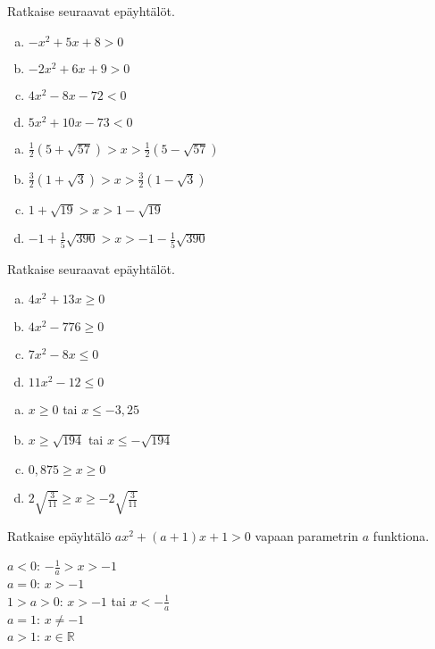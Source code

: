 \begin{tehtava}
    Ratkaise seuraavat epäyhtälöt.
    \begin{enumerate}[(a)]
        \item $-x^2+5x+8>0$
        \item $-2x^2+6x+9>0$
        \item $4x^2-8x-72<0$
        \item $5x^2+10x-73<0$
    \end{enumerate}
    \begin{vastaus}
        \begin{enumerate}[(a)]
            \item $\frac{1}{2} (5+\sqrt{57}) > x > \frac{1}{2} (5-\sqrt{57})$
            \item $\frac{3}{2} (1+\sqrt{3}) > x > \frac{3}{2} (1-\sqrt{3})$
            \item $1+\sqrt{19} > x > 1-\sqrt{19}$
            \item $-1+\frac{1}{5} \sqrt{390} > x > -1-\frac{1}{5} \sqrt{390}$
        \end{enumerate}
    \end{vastaus}
\end{tehtava}

\begin{tehtava}
    Ratkaise seuraavat epäyhtälöt.
    \begin{enumerate}[(a)]
        \item $4x^2+13x\geq 0$
        \item $4x^2-776\geq 0$
        \item $7x^2-8x\leq 0$
        \item $11x^2-12\leq 0$
    \end{enumerate}
    \begin{vastaus}
        \begin{enumerate}[(a)]
            \item $x \geq 0$ tai $x \leq -3,25$
            \item $x \geq \sqrt{194}$ tai $x \leq -\sqrt{194}$
            \item $0,875 \geq x \geq 0$
            \item $2\sqrt{\frac{3}{11}} \geq x \geq -2\sqrt{\frac{3}{11}}$
        \end{enumerate}
    \end{vastaus}
\end{tehtava}

\begin{tehtava}
    Ratkaise epäyhtälö $ax^2+(a+1)x+1 > 0$ vapaan parametrin $a$ funktiona.
    \begin{vastaus}
        $a < 0$: $-\frac{1}{a} > x > -1$ \\ $a = 0$: $x > -1$ \\ $1 > a > 0$: $x > -1$ tai $x < -\frac{1}{a}$ \\ $a = 1$: $x \neq -1$ \\ $a > 1$: $x \in \mathbb{R}$
    \end{vastaus}
\end{tehtava}

